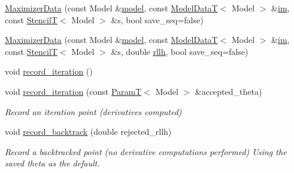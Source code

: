\begin{DoxyCompactItemize}
\item 
\hyperlink{classmappel_1_1estimator_1_1IterativeMaximizer_1_1MaximizerData_aa69acdb7d28bfbb67840687152046b83}{Maximizer\+Data} (const Model \&\hyperlink{classmappel_1_1estimator_1_1Estimator_a2f157410771fb79a20d4d54e505750d0}{model}, const \hyperlink{namespacemappel_a97f050df953605381ae9c901c3b125f1}{Model\+DataT}$<$ Model $>$ \&\hyperlink{classmappel_1_1estimator_1_1IterativeMaximizer_1_1MaximizerData_a01a762941a06e7f6839817971674c354}{im}, const \hyperlink{namespacemappel_a3a06598240007876f8c4bf834ad86197}{StencilT}$<$ Model $>$ \&s, bool save\+\_\+seq=false)
\item 
\hyperlink{classmappel_1_1estimator_1_1IterativeMaximizer_1_1MaximizerData_a73c73af35a60c5df03a10a6418641931}{Maximizer\+Data} (const Model \&\hyperlink{classmappel_1_1estimator_1_1Estimator_a2f157410771fb79a20d4d54e505750d0}{model}, const \hyperlink{namespacemappel_a97f050df953605381ae9c901c3b125f1}{Model\+DataT}$<$ Model $>$ \&\hyperlink{classmappel_1_1estimator_1_1IterativeMaximizer_1_1MaximizerData_a01a762941a06e7f6839817971674c354}{im}, const \hyperlink{namespacemappel_a3a06598240007876f8c4bf834ad86197}{StencilT}$<$ Model $>$ \&s, double \hyperlink{classmappel_1_1estimator_1_1IterativeMaximizer_1_1MaximizerData_a8df6de6efff1eab16147e3ab42f98469}{rllh}, bool save\+\_\+seq=false)
\item 
void \hyperlink{classmappel_1_1estimator_1_1IterativeMaximizer_1_1MaximizerData_a7be130872c847e2fb790eafeaf1b077a}{record\+\_\+iteration} ()
\item 
void \hyperlink{classmappel_1_1estimator_1_1IterativeMaximizer_1_1MaximizerData_a25acd7493399571e24ffd3f87d4000af}{record\+\_\+iteration} (const \hyperlink{namespacemappel_a667925cb0d6c0e49f2f035cc5a9a6857}{ParamT}$<$ Model $>$ \&accepted\+\_\+theta)
\begin{DoxyCompactList}\small\item\em Record an iteration point (derivatives computed) \end{DoxyCompactList}\item 
void \hyperlink{classmappel_1_1estimator_1_1IterativeMaximizer_1_1MaximizerData_a4d990fafab43a4a8c9212ae0076adcf2}{record\+\_\+backtrack} (double rejected\+\_\+rllh)
\begin{DoxyCompactList}\small\item\em Record a backtracked point (no derivative computations performed) Using the saved theta as the default. \end{DoxyCompactList}\item 

\end{DoxyCompactItemize}

